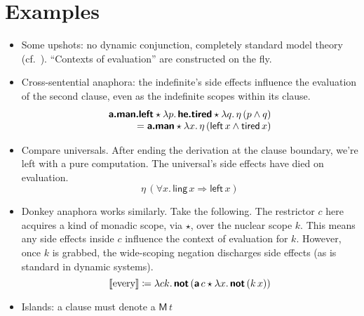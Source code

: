 \section{Examples}
\begin{itemize}
	\item Some upshots: no dynamic conjunction, completely standard model theory (cf.~\citealt{Groote:2006}). ``Contexts of evaluation'' are constructed on the fly. %
	
	\item Cross-sentential anaphora: the indefinite's side effects influence the evaluation of the second clause, even as the indefinite scopes within its clause. %
	\[\begin{array}{r}
		\bsf{a.man.left} \star \lambda p.\,\bsf{he.tired} \star \lambda q.\,\eta\,(p \wedge q)%
		\\
		= \bsf{a.man} \star \lambda x.\,\eta\,(\textsf{left}\,x \wedge \textsf{tired}\,x)%
	\end{array}\]
	
	\item Compare universals. After ending the derivation at the clause boundary, we're left with a pure computation. The universal's side effects have died on evaluation.%
	\[\eta\,(\forall x.\,\textsf{ling}\,x \Rightarrow \textsf{left}\,x)\]
	
	\item Donkey anaphora works similarly. Take the following. The restrictor $c$ here acquires a kind of monadic scope, via $\star$, over the nuclear scope $k$. This means any side effects inside $c$ influence the context of evaluation for $k$. However, once $k$ is grabbed, the wide-scoping negation discharges side effects (as is standard in dynamic systems). %
	\[\left [\!\left [ \text{every} \right ]\!\right ] \coloneqq \lambda ck.\,\textbf{\textsf{not}}\,(\textbf{\textsf{a}}\,c \star \lambda x.\,\textbf{\textsf{not}}\,(k\,x))\]%
	
	\item Islands: a clause must denote a $\textsf{M}\,t$
\end{itemize}

\citealt{Groote:2001}
\citealt{Charlow:diss}
\citealt{Bumford:inc}

{\small}
